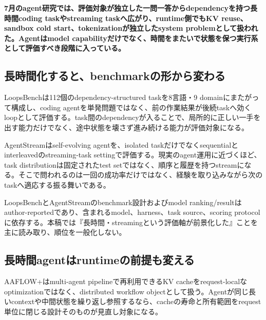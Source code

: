 \noindent\textbf{7月のagent研究では、評価対象が独立した一問一答からdependencyを持つ長時間coding taskやstreaming taskへ広がり、runtime側でもKV reuse、sandbox cold start、tokenizationが独立したsystem problemとして扱われた。Agentはmodel capabilityだけでなく、時間をまたいで状態を保つ実行系として評価すべき段階に入っている。}\autocite{src-30d9d574d4a1,src-4051106eaef3,src-4141dfcd9b12}

\par\medskip{}
\subsection{長時間化すると、benchmarkの形から変わる}

LoopsBenchは112個のdependency-structured taskを8言語・9 domainにまたがって構成し、coding agentを単発問題ではなく、前の作業結果が後続taskへ効くloopとして評価する。task間のdependencyが入ることで、局所的に正しい一手を出す能力だけでなく、途中状態を壊さず進み続ける能力が評価対象になる。\autocite{src-4141dfcd9b12}


AgentStreamはself-evolving agentを、isolated taskだけでなくsequentialとinterleavedのstreaming-task settingで評価する。現実のagent運用に近づくほど、task distributionは固定されたtest setではなく、順序と履歴を持つstreamになる。そこで問われるのは一回の成功率だけではなく、経験を取り込みながら次のtaskへ適応する振る舞いである。\autocite{src-30d9d574d4a1}


\begin{claimboundary}
LoopsBenchとAgentStreamのbenchmark設計およびmodel ranking/resultはauthor-reportedであり、含まれるmodel、harness、task source、scoring protocolに依存する。本稿では『長時間・streamingという評価軸が前景化した』ことを主に読み取り、順位を一般化しない。\autocite{src-30d9d574d4a1,src-4141dfcd9b12}
\end{claimboundary}

\par\medskip{}
\subsection{長時間agentはruntimeの前提も変える}

AAFLOW+はmulti-agent pipelineで再利用できるKV cacheをrequest-localなoptimizationではなく、distributed workflow objectとして扱う。Agentが同じ長いcontextや中間状態を繰り返し参照するなら、cacheの寿命と所有範囲をrequest単位に閉じる設計そのものが見直し対象になる。\autocite{src-4051106eaef3}


